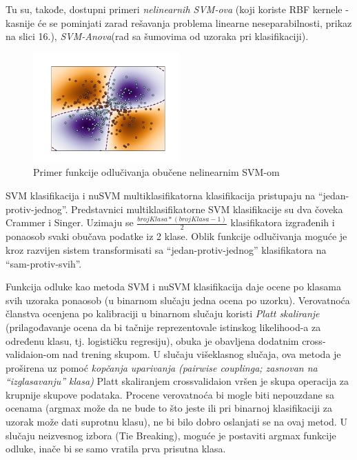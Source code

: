 \documentclass[fontsize=12bp, paper=a4]{scrarticle}
\begin{document}
Tu su, takođe, dostupni primeri \textit{nelinearnih SVM-ova} (koji koriste RBF kernele - kasnije će se pominjati zarad rešavanja problema linearne neseparabilnosti, prikaz na slici 16.)\cite{nonlinsvm}, \textit{SVM-Anova}(rad sa šumovima od uzoraka pri klasifikaciji)\cite{anova}.

\begin{figure}[h!]
    \centering
    \includegraphics[width=0.5\textwidth]{image-14.png}
    \caption{Primer funkcije odlučivanja obučene nelinearnim SVM-om}
\end{figure}



SVM klasifikacija i nuSVM multiklasifikatorna klasifikacija pristupaju na ``jedan-protiv-jednog''. Predstavnici multiklasifikatorne SVM klasifikacije su dva čoveka Crammer i Singer.
Uzimaju se  $\frac{\textit{brojKlasa} * (\textit{brojKlasa} - 1) }{ 2}$ klasifikatora izgrađenih i ponaosob svaki obučava podatke iz 2 klase. Oblik funkcije odlučivanja moguće je kroz razvijen sistem transformisati sa ``jedan-protiv-jednog'' klasifikatora na ``sam-protiv-svih''.

Funkcija odluke kao metoda SVM i nuSVM klasifikacija daje ocene po klasama svih uzoraka ponaosob (u binarnom slučaju jedna ocena po uzorku). Verovatnoća članstva ocenjena po kalibraciji u binarnom slučaju koristi \textit{Platt skaliranje} (prilagođavanje ocena da bi tačnije reprezentovale istinskog likelihood-a za određenu klasu, tj. logističku regresiju)\cite{platt}, obuka je obavljena dodatnim cross-validaion-om nad trening skupom.  U slučaju višeklasnog slučaja, ova metoda je proširena uz pomoć \textit{kopčanja uparivanja (pairwise couplinga; zasnovan na ``izglasavanju'' klasa)}\cite{pairwise}
Platt skaliranjem crossvalidaion vršen je skupa operacija za krupnije skupove podataka. Procene verovatnoća bi mogle biti nepouzdane sa ocenama (argmax može da ne bude to što jeste ili pri binarnoj klasifikaciji za uzorak može dati suprotnu klasu), ne bi bilo dobro oslanjati se na ovaj metod.
U slučaju neizvesnog izbora (Tie Breaking), moguće je postaviti argmax funkcije odluke, inače bi se samo vratila prva prisutna klasa. 
\end{document}
